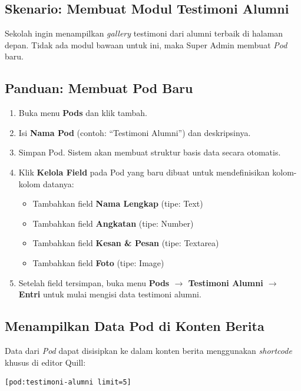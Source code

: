 \subsection{Skenario: Membuat Modul Testimoni Alumni}

Sekolah ingin menampilkan \textit{gallery} testimoni dari alumni terbaik di halaman depan.
Tidak ada modul bawaan untuk ini, maka Super Admin membuat \textit{Pod} baru.

\subsection{Panduan: Membuat Pod Baru}

\begin{enumerate}
  \item Buka menu \textbf{Pods} dan klik tambah.
  \item Isi \textbf{Nama Pod} (contoh: ``Testimoni Alumni'') dan deskripsinya.
  \item Simpan Pod. Sistem akan membuat struktur basis data secara otomatis.
  \item Klik \textbf{Kelola Field} pada Pod yang baru dibuat untuk mendefinisikan
        kolom-kolom datanya:
        \begin{itemize}
          \item Tambahkan field \textbf{Nama Lengkap} (tipe: Text)
          \item Tambahkan field \textbf{Angkatan} (tipe: Number)
          \item Tambahkan field \textbf{Kesan \& Pesan} (tipe: Textarea)
          \item Tambahkan field \textbf{Foto} (tipe: Image)
        \end{itemize}
  \item Setelah field tersimpan, buka menu \textbf{Pods $\rightarrow$ Testimoni Alumni $\rightarrow$ Entri}
        untuk mulai mengisi data testimoni alumni.
\end{enumerate}

\subsection{Menampilkan Data Pod di Konten Berita}

Data dari \textit{Pod} dapat disisipkan ke dalam konten berita menggunakan \textit{shortcode}
khusus di editor Quill:

\begin{lstlisting}
[pod:testimoni-alumni limit=5]
\end{lstlisting}

